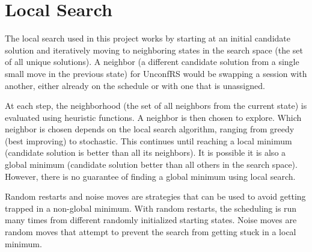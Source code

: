 \section{Local Search}
The local search used in this project works by starting at an initial candidate solution and iteratively moving to neighboring states in the search space (the set of all unique solutions). A neighbor (a different candidate solution from a single small move in the previous state) for UnconfRS would be swapping a session with another, either already on the schedule or with one that is unassigned.

At each step, the neighborhood (the set of all neighbors from the current state) is evaluated using heuristic functions. A neighbor is then chosen to explore. Which neighbor is chosen depends on the local search algorithm, ranging from greedy (best improving) to stochastic. This continues until reaching a local minimum (candidate solution is better than all its neighbors). It is possible it is also a global minimum (candidate solution better than all others in the search space). However, there is no guarantee of finding a global minimum using local search.

Random restarts and noise moves are strategies that can be used to avoid getting trapped in a non-global minimum. With random restarts, the scheduling is run many times from different randomly initialized starting states. Noise moves are random moves that attempt to prevent the search from getting stuck in a local minimum.